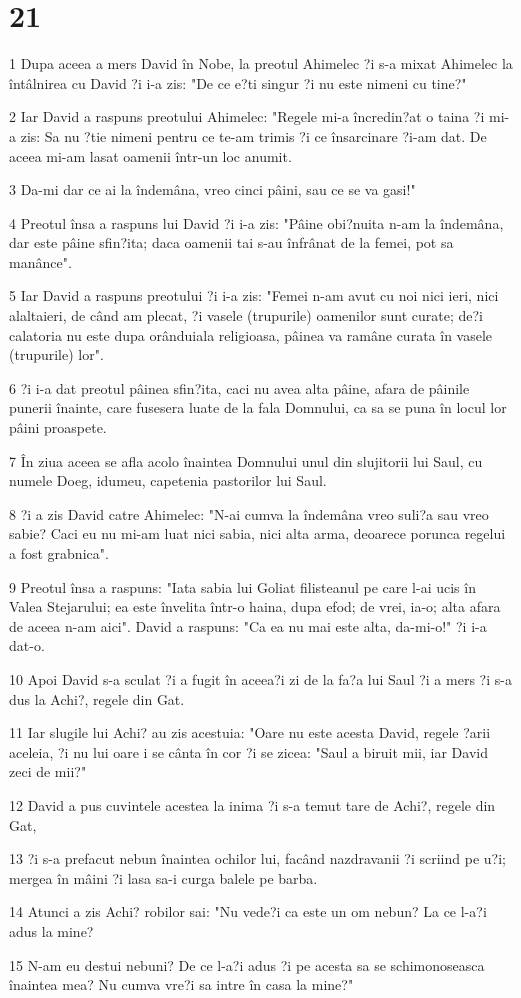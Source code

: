 \chapter{21}

\par 1 Dupa aceea a mers David în Nobe, la preotul Ahimelec ?i s-a mixat Ahimelec la întâlnirea cu David ?i i-a zis: "De ce e?ti singur ?i nu este nimeni cu tine?"
\par 2 Iar David a raspuns preotului Ahimelec: "Regele mi-a încredin?at o taina ?i mi-a zis: Sa nu ?tie nimeni pentru ce te-am trimis ?i ce însarcinare ?i-am dat. De aceea mi-am lasat oamenii într-un loc anumit.
\par 3 Da-mi dar ce ai la îndemâna, vreo cinci pâini, sau ce se va gasi!"
\par 4 Preotul însa a raspuns lui David ?i i-a zis: "Pâine obi?nuita n-am la îndemâna, dar este pâine sfin?ita; daca oamenii tai s-au înfrânat de la femei, pot sa manânce".
\par 5 Iar David a raspuns preotului ?i i-a zis: "Femei n-am avut cu noi nici ieri, nici alaltaieri, de când am plecat, ?i vasele (trupurile) oamenilor sunt curate; de?i calatoria nu este dupa orânduiala religioasa, pâinea va ramâne curata în vasele (trupurile) lor".
\par 6 ?i i-a dat preotul pâinea sfin?ita, caci nu avea alta pâine, afara de pâinile punerii înainte, care fusesera luate de la fala Domnului, ca sa se puna în locul lor pâini proaspete.
\par 7 În ziua aceea se afla acolo înaintea Domnului unul din slujitorii lui Saul, cu numele Doeg, idumeu, capetenia pastorilor lui Saul.
\par 8 ?i a zis David catre Ahimelec: "N-ai cumva la îndemâna vreo suli?a sau vreo sabie? Caci eu nu mi-am luat nici sabia, nici alta arma, deoarece porunca regelui a fost grabnica".
\par 9 Preotul însa a raspuns: "Iata sabia lui Goliat filisteanul pe care l-ai ucis în Valea Stejarului; ea este învelita într-o haina, dupa efod; de vrei, ia-o; alta afara de aceea n-am aici". David a raspuns: "Ca ea nu mai este alta, da-mi-o!" ?i i-a dat-o.
\par 10 Apoi David s-a sculat ?i a fugit în aceea?i zi de la fa?a lui Saul ?i a mers ?i s-a dus la Achi?, regele din Gat.
\par 11 Iar slugile lui Achi? au zis acestuia: "Oare nu este acesta David, regele ?arii aceleia, ?i nu lui oare i se cânta în cor ?i se zicea: "Saul a biruit mii, iar David zeci de mii?"
\par 12 David a pus cuvintele acestea la inima ?i s-a temut tare de Achi?, regele din Gat,
\par 13 ?i s-a prefacut nebun înaintea ochilor lui, facând nazdravanii ?i scriind pe u?i; mergea în mâini ?i lasa sa-i curga balele pe barba.
\par 14 Atunci a zis Achi? robilor sai: "Nu vede?i ca este un om nebun? La ce l-a?i adus la mine?
\par 15 N-am eu destui nebuni? De ce l-a?i adus ?i pe acesta sa se schimonoseasca înaintea mea? Nu cumva vre?i sa intre în casa la mine?"

